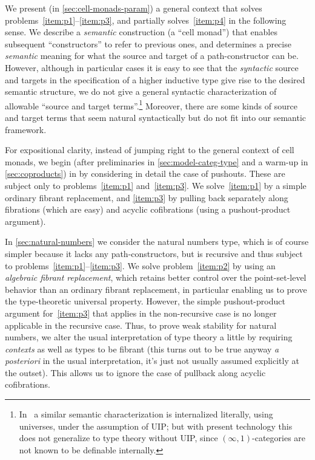 \documentclass{amsart}
\begin{document}
We present (in \cref{sec:cell-monads-param}) a general context that solves problems~\ref{item:p1}--\ref{item:p3}, and partially solves~\ref{item:p4} in the following sense.
We describe a \emph{semantic} construction (a ``cell monad'') that enables subsequent ``constructors'' to refer to previous ones, and determines a precise \emph{semantic} meaning for what the source and target of a path-constructor can be.
However, although in particular cases it is easy to see that the \emph{syntactic} source and targets in the specification of a higher inductive type give rise to the desired semantic structure, we do not give a general syntactic characterization of allowable ``source and target terms''.\footnote{In~\cite{acdf:qiits} a similar semantic characterization is internalized literally, using universes, under the assumption of UIP; but with present technology this does not generalize to type theory without UIP, since $(\infty,1)$-categories are not known to be definable internally.}
Moreover, there are some kinds of source and target terms that seem natural syntactically but do not fit into our semantic framework.

For expositional clarity, instead of jumping right to the general context of cell monads, we begin (after preliminaries in \cref{sec:model-categ-type} and a warm-up in \cref{sec:coproducts}) in  by considering in detail the case of pushouts.
These are subject only to problems~\ref{item:p1} and~\ref{item:p3}.
We solve~\ref{item:p1} by a simple ordinary fibrant replacement, and \ref{item:p3} by pulling back separately along fibrations (which are easy) and acyclic cofibrations (using a pushout-product argument).

In \cref{sec:natural-numbers} we consider the natural numbers type, which is of course simpler because it lacks any path-constructors, but is recursive and thus subject to problems~\ref{item:p1}--\ref{item:p3}.
We solve problem~\ref{item:p2} by using an \emph{algebraic fibrant replacement}, which retains better control over the point-set-level behavior than an ordinary fibrant replacement, in particular enabling us to prove the type-theoretic universal property.
However, the simple pushout-product argument for~\ref{item:p3} that applies in the non-recursive case is no longer applicable in the recursive case.
Thus, to prove weak stability for natural numbers, we alter the usual interpretation of type theory a little by requiring \emph{contexts} as well as types to be fibrant (this turns out to be true anyway \emph{a posteriori} in the usual interpretation, it's just not usually assumed explicitly at the outset).
This allows us to ignore the case of pullback along acyclic cofibrations.
\end{document}
